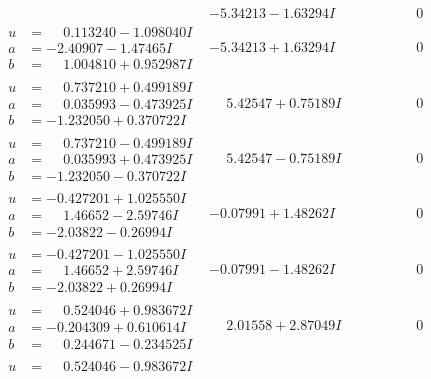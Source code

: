 \documentclass[1p]{elsarticle_modified}
\theoremstyle{definition}
\begin{document}
$$\begin{array}{c|c|c}
 & -5.34213 - 1.63294 I & \phantom{-0.000000 } 0 \\ \hline\begin{aligned}
u &= \phantom{-}0.113240 - 1.098040 I \\
a &= -2.40907 - 1.47465 I \\
b &= \phantom{-}1.004810 + 0.952987 I\end{aligned}
 & -5.34213 + 1.63294 I & \phantom{-0.000000 } 0 \\ \hline\begin{aligned}
u &= \phantom{-}0.737210 + 0.499189 I \\
a &= \phantom{-}0.035993 - 0.473925 I \\
b &= -1.232050 + 0.370722 I\end{aligned}
 & \phantom{-}5.42547 + 0.75189 I & \phantom{-0.000000 } 0 \\ \hline\begin{aligned}
u &= \phantom{-}0.737210 - 0.499189 I \\
a &= \phantom{-}0.035993 + 0.473925 I \\
b &= -1.232050 - 0.370722 I\end{aligned}
 & \phantom{-}5.42547 - 0.75189 I & \phantom{-0.000000 } 0 \\ \hline\begin{aligned}
u &= -0.427201 + 1.025550 I \\
a &= \phantom{-}1.46652 - 2.59746 I \\
b &= -2.03822 - 0.26994 I\end{aligned}
 & -0.07991 + 1.48262 I & \phantom{-0.000000 } 0 \\ \hline\begin{aligned}
u &= -0.427201 - 1.025550 I \\
a &= \phantom{-}1.46652 + 2.59746 I \\
b &= -2.03822 + 0.26994 I\end{aligned}
 & -0.07991 - 1.48262 I & \phantom{-0.000000 } 0 \\ \hline\begin{aligned}
u &= \phantom{-}0.524046 + 0.983672 I \\
a &= -0.204309 + 0.610614 I \\
b &= \phantom{-}0.244671 - 0.234525 I\end{aligned}
 & \phantom{-}2.01558 + 2.87049 I & \phantom{-0.000000 } 0 \\ \hline\begin{aligned}
u &= \phantom{-}0.524046 - 0.983672 I \\

\end{aligned}
\end{array}$$
\end{document}
